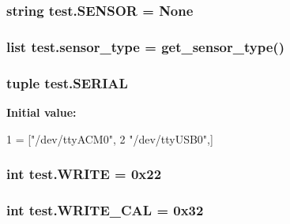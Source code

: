 \hypertarget{namespacetest_a2391ebb4e984e0aa09635f75c5d04c0c}{
\subsubsection[{S\-E\-N\-S\-O\-R}]{\setlength{\rightskip}{0pt plus 5cm}string test.\-S\-E\-N\-S\-O\-R = None}}\label{namespacetest_a2391ebb4e984e0aa09635f75c5d04c0c}
\hypertarget{namespacetest_a91abf77ee3cdf450b2ff3282338cadff}{
\subsubsection[{sensor\-\_\-type}]{\setlength{\rightskip}{0pt plus 5cm}list test.\-sensor\-\_\-type = {\bf get\-\_\-sensor\-\_\-type}()}}\label{namespacetest_a91abf77ee3cdf450b2ff3282338cadff}
\hypertarget{namespacetest_a7c0b7ecb3e3b010c842bfe515e7a10b4}{
\subsubsection[{S\-E\-R\-I\-A\-L}]{\setlength{\rightskip}{0pt plus 5cm}tuple test.\-S\-E\-R\-I\-A\-L}}\label{namespacetest_a7c0b7ecb3e3b010c842bfe515e7a10b4}
{\bfseries Initial value\-:}
\begin{DoxyCode}
1 = [\textcolor{stringliteral}{"/dev/ttyACM0"},
2           \textcolor{stringliteral}{"/dev/ttyUSB0"},]
\end{DoxyCode}
\hypertarget{namespacetest_ac2d4de6ac2d32927ec95407a12368ea4}{
\subsubsection[{W\-R\-I\-T\-E}]{\setlength{\rightskip}{0pt plus 5cm}int test.\-W\-R\-I\-T\-E = 0x22}}\label{namespacetest_ac2d4de6ac2d32927ec95407a12368ea4}
\hypertarget{namespacetest_ad426fa2987715f1e3e91b16989000b52}{
\subsubsection[{W\-R\-I\-T\-E\-\_\-\-C\-A\-L}]{\setlength{\rightskip}{0pt plus 5cm}int test.\-W\-R\-I\-T\-E\-\_\-\-C\-A\-L = 0x32}}\label{namespacetest_ad426fa2987715f1e3e91b16989000b52}
